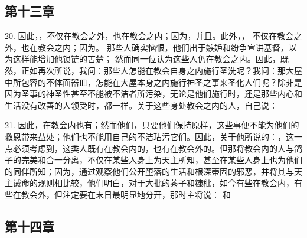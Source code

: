 
\subsection{第十三章}

20. 因此，，不仅在教会之外，也在教会之内；因为，并且。此外，， 不仅在教会之外，也在教会之内；因为。 那些人确实恼恨，他们出于嫉妒和纷争宣讲基督，以为这样能增加他锁链的苦楚； 然而同一位认为这些人仍在教会之内。因此，既然，正如再次所说，我问：那些人怎能在教会自身之内施行圣洗呢？我问：那大屋中所包容的不体面器皿，怎能在大屋本身之内施行神圣之事来圣化人们呢？除非是因为圣事的神圣性甚至不能被不洁者所污染，无论是他们施行时，还是那些内心和生活没有改善的人领受时，都一样。关于这些身处教会之内的人，自己说：\par

21. 因此，在教会内也有；然而他们，只要他们保持原样，这些事便不能为他们的救恩带来益处；他们也不能用自己的不洁玷污它们。因此，关于他所说的：，这一点必须考虑到，这类人既有在教会内的，也有在教会外的。但那将教会内的人与鸽子的完美和合一分离，不仅在某些人身上为天主所知，甚至在某些人身上也为他们的同伴所知；因为，通过观察他们公开堕落的生活和根深蒂固的邪恶，并将其与天主诫命的规则相比较，他们明白，对于大批的莠子和糠秕，如今有些在教会内，有些在教会外，但注定要在末日最明显地分开，那时主将说： 和 \par


\subsection{第十四章\newline{}}

